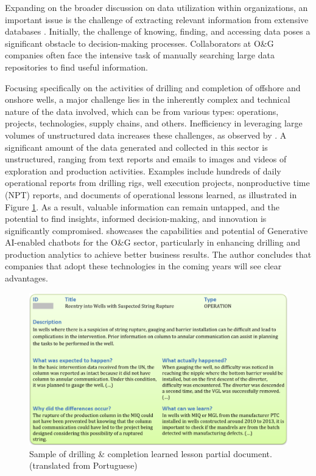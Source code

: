             
    Expanding on the broader discussion on data utilization within organizations, an important issue is the challenge of extracting relevant information from extensive databases \citep{Singh2023}. 
    Initially, the challenge of knowing, finding, and accessing data poses a significant obstacle to decision-making processes. 
    Collaborators at O\&G companies often face the intensive task of manually searching large data repositories to find useful information.


    
    Focusing specifically on the activities of drilling and completion of offshore and onshore wells, a major challenge lies in the inherently complex and technical nature of the data involved, which can be from various types: operations, projects, technologies, supply chains, and others. 
    Inefficiency in leveraging large volumes of unstructured data increases these challenges, as observed by \citet{Singh2023}. 
    A significant amount of the data generated and collected in this sector is unstructured, ranging from text reports and emails to images and videos of exploration and production activities. 
    Examples include hundreds of daily operational reports from drilling rigs, well execution projects, nonproductive time (NPT) reports, and documents of operational lessons learned, as illustrated in Figure \ref{fig:report_example}. 
    As a result, valuable information can remain untapped, and the potential to find insights, informed decision-making, and innovation is significantly compromised.
    \citet{Singh2023} showcases the capabilities and potential of Generative AI-enabled chatbots for the O\&G sector, particularly in enhancing drilling and production analytics to achieve better business results. The author concludes that companies that adopt these technologies in the coming years will see clear advantages.     
    
    \begin{figure}[t]
        \centering
        \includegraphics[width=1\textwidth]{images/report_example.png}
        \caption{Sample of drilling \& completion learned lesson partial document. (translated from Portuguese)}
        \label{fig:report_example}
    \end{figure}           
    
